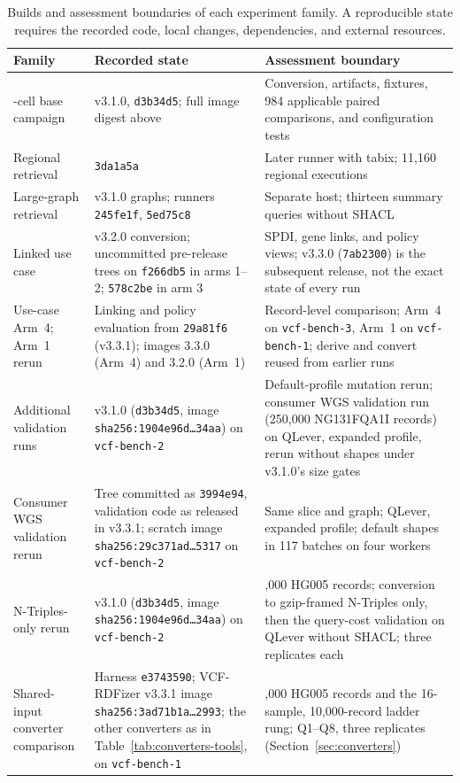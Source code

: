 \documentclass[11pt]{article}
\newcommand{\rowsep}{\noalign{\vskip2pt{\color{black!22}\hrule height 0.4pt}\vskip2pt}}%
\begin{document}
\begin{table}[!htbp]
\caption{Builds and assessment boundaries of each experiment family. A reproducible state requires the recorded code, local changes, dependencies, and external resources.}\label{tab:builds}%
\centering\footnotesize\setlength{\tabcolsep}{4pt}\renewcommand{\arraystretch}{1.1}\renewcommand{\tabularxcolumn}[1]{m{#1}}%
\begin{tabularx}{\textwidth}{@{}>{\raggedright\arraybackslash}m{}>{\raggedright\arraybackslash}m{}>{\raggedright\arraybackslash}X@{}}
\toprule
\textbf{Family} & \textbf{Recorded state} & \textbf{Assessment boundary}\\
\midrule
143-cell base campaign & v3.1.0, \texttt{d3b34d5}; full image digest above & Conversion, artifacts, fixtures, 984 applicable paired comparisons, and configuration tests\\
\rowsep
Regional retrieval & \texttt{3da1a5a} & Later runner with tabix; 11{,}160 regional executions\\
\rowsep
Large-graph retrieval & v3.1.0 graphs; runners \texttt{245fe1f}, \texttt{5ed75c8} & Separate host; thirteen summary queries without SHACL\\
\rowsep
Linked use case & v3.2.0 conversion; uncommitted pre-release trees on \texttt{f266db5} in arms 1--2; \texttt{578c2be} in arm 3 & SPDI, gene links, and policy views; v3.3.0 (\texttt{7ab2300}) is the subsequent release, not the exact state of every run\\
\rowsep
Use-case Arm~4; Arm~1 rerun & Linking and policy evaluation from \texttt{29a81f6} (v3.3.1); images 3.3.0 (Arm~4) and 3.2.0 (Arm~1) & Record-level comparison; Arm~4 on \texttt{vcf-bench-3}, Arm~1 on \texttt{vcf-bench-1}; derive and convert reused from earlier runs\\
\rowsep
Additional validation runs & v3.1.0 (\texttt{d3b34d5}, image \texttt{sha256:1904e96d\ldots34aa}) on \texttt{vcf-bench-2} & Default-profile mutation rerun; consumer WGS validation run (250{,}000 NG131FQA1I records) on QLever, expanded profile, rerun without shapes under v3.1.0's size gates\\
\rowsep
Consumer WGS validation rerun & Tree committed as \texttt{3994e94}, validation code as released in v3.3.1; scratch image \texttt{sha256:29c371ad\ldots5317} on \texttt{vcf-bench-2} & Same slice and graph; QLever, expanded profile; default shapes in 117 batches on four workers\\
\rowsep
N-Triples-only rerun & v3.1.0 (\texttt{d3b34d5}, image \texttt{sha256:1904e96d\ldots34aa}) on \texttt{vcf-bench-2} & 100,000 HG005 records; conversion to gzip-framed N-Triples only, then the query-cost validation on QLever without SHACL; three replicates each\\
\rowsep
Shared-input converter comparison & Harness \texttt{e3743590}; VCF-RDFizer v3.3.1 image \texttt{sha256:3ad71b1a\ldots2993}; the other converters as in Table~\ref{tab:converters-tools}, on \texttt{vcf-bench-1} & 100,000 HG005 records and the 16-sample, 10,000-record ladder rung; Q1--Q8, three replicates (Section~\ref{sec:converters})\\
\bottomrule
\end{tabularx}
\end{table}
\end{document}
